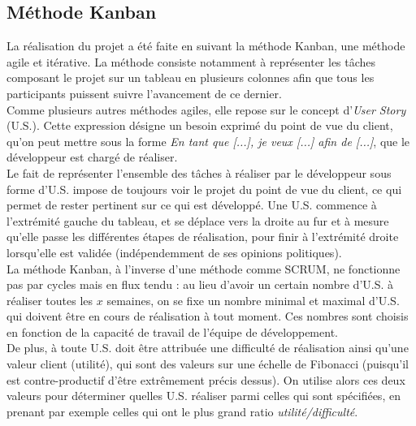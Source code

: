 
\subsection{Méthode Kanban}

La réalisation du projet a été faite en suivant la méthode Kanban, une méthode agile et itérative. La méthode consiste notamment à représenter les tâches composant le projet sur un tableau en plusieurs colonnes afin que tous les participants puissent suivre l'avancement de ce dernier.\\

Comme plusieurs autres méthodes agiles, elle repose sur le concept d'\textit{User Story} (U.S.). Cette expression désigne un besoin exprimé du point de vue du client, qu'on peut mettre sous la forme \textit{En tant que [...], je veux [...] afin de [...]}, que le développeur est chargé de réaliser.\\

Le fait de représenter l'ensemble des tâches à réaliser par le développeur sous forme d'U.S. impose de toujours voir le projet du point de vue du client, ce qui permet de rester pertinent sur ce qui est développé. Une U.S. commence à l'extrémité gauche du tableau, et se déplace vers la droite au fur et à mesure qu'elle passe les différentes étapes de réalisation, pour finir à l'extrémité droite lorsqu'elle est validée (indépendemment de ses opinions politiques).\\

La méthode Kanban, à l'inverse d'une méthode comme SCRUM, ne fonctionne pas par cycles mais en flux tendu : au lieu d'avoir un certain nombre d'U.S. à réaliser toutes les $x$ semaines, on se fixe un nombre minimal et maximal d'U.S. qui doivent être en cours de réalisation à tout moment. Ces nombres sont choisis en fonction de la capacité de travail de l'équipe de développement.\\

De plus, à toute U.S. doit être attribuée une difficulté de réalisation ainsi qu'une valeur client (utilité), qui sont des valeurs sur une échelle de Fibonacci (puisqu'il est contre-productif d'être extrêmement précis dessus). On utilise alors ces deux valeurs pour déterminer quelles U.S. réaliser parmi celles qui sont spécifiées, en prenant par exemple celles qui ont le plus grand ratio \textit{utilité/difficulté}.\\


